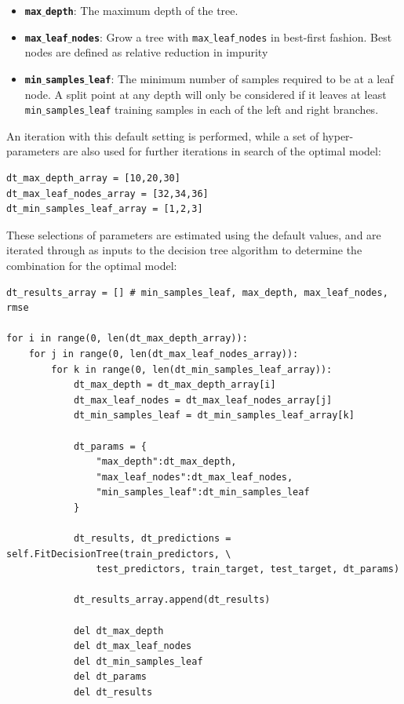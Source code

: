 \documentclass[11pt,a4paper,titlepage]{article}
\begin{document}
\begin{itemize}
    \item{\textbf{\texttt{max$\_$depth}}: The maximum depth of the tree.}
    \item{\textbf{\texttt{max$\_$leaf$\_$nodes}}: Grow a tree with \texttt{max$\_$leaf$\_$nodes} in best-first fashion. Best nodes are defined as relative reduction in impurity}
    \item{\textbf{\texttt{min$\_$samples$\_$leaf}}: The minimum number of samples required to be at a leaf node. A split point at any depth will only be considered if it leaves at least \texttt{min$\_$samples$\_$leaf} training samples in each of the left and right branches.}
\end{itemize}

An iteration with this default setting is performed, while a set of hyper-parameters are also used for further iterations in search of the optimal model:

\begin{verbatim}
dt_max_depth_array = [10,20,30]
dt_max_leaf_nodes_array = [32,34,36]
dt_min_samples_leaf_array = [1,2,3]
\end{verbatim}

These selections of parameters are estimated using the default values, and are iterated through as inputs to the decision tree algorithm to determine the combination for the optimal model:

\begin{verbatim}
dt_results_array = [] # min_samples_leaf, max_depth, max_leaf_nodes, rmse

for i in range(0, len(dt_max_depth_array)):
    for j in range(0, len(dt_max_leaf_nodes_array)):
        for k in range(0, len(dt_min_samples_leaf_array)):
            dt_max_depth = dt_max_depth_array[i]
            dt_max_leaf_nodes = dt_max_leaf_nodes_array[j]
            dt_min_samples_leaf = dt_min_samples_leaf_array[k]

            dt_params = {
                "max_depth":dt_max_depth,
                "max_leaf_nodes":dt_max_leaf_nodes,
                "min_samples_leaf":dt_min_samples_leaf
            }

            dt_results, dt_predictions = self.FitDecisionTree(train_predictors, \
                test_predictors, train_target, test_target, dt_params)

            dt_results_array.append(dt_results)

            del dt_max_depth
            del dt_max_leaf_nodes
            del dt_min_samples_leaf
            del dt_params
            del dt_results
\end{verbatim}
\end{document}
